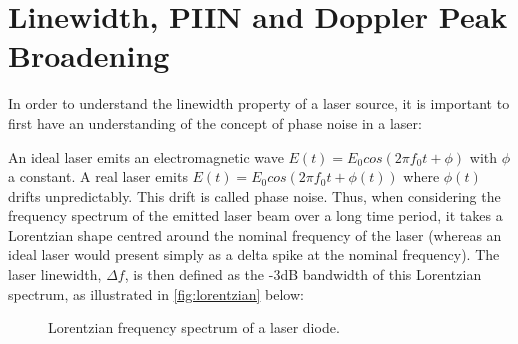 \chapter{Linewidth, PIIN and Doppler Peak Broadening}
\label{appendix:PIIN}
In order to understand the linewidth property of a laser source, it is important to first have an understanding of the concept of phase noise in a laser:

    An ideal laser emits an electromagnetic wave $E(t) = E_0cos(2\pi f_0t + \phi)$ with $\phi$ a constant. A real laser emits $E(t)=E_0cos(2\pi f_0t + \phi(t))$ where $\phi(t)$ drifts unpredictably. This drift is called phase noise. Thus, when considering the frequency spectrum of the emitted laser beam over a long time period, it takes a Lorentzian shape centred around the nominal frequency of the laser (whereas an ideal laser would present simply as a delta spike at the nominal frequency). The laser linewidth, $\Delta f$, is then defined as the -3dB bandwidth of this Lorentzian spectrum, as illustrated in \autoref{fig:lorentzian} below:

    \begin{figure}[H]
    \centering
    \caption{Lorentzian frequency spectrum of a laser diode.}
    \label{fig:lorentzian}
    \end{figure}

